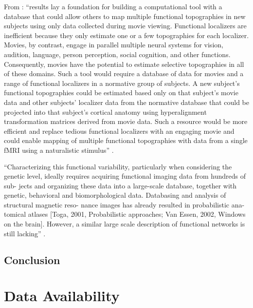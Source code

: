 %
From \citep{jiahui2020predicting}: ``results lay a foundation for building a
computational tool with a database that could allow others to map multiple
functional topographies in new subjects using only data collected during movie
viewing. Functional localizers are inefficient because they only estimate one or
a few topographies for each localizer. Movies, by contrast, engage in parallel
multiple neural systems for vision, audition, language, person perception,
social cognition, and other functions. Consequently, movies have the potential
to estimate selective topographies in all of these domains. Such a tool would
require a database of data for movies and a range of functional localizers in a
normative group of subjects. A new subject's functional topographies could be
estimated based only on that subject's movie data and other subjects’ localizer
data from the normative database that could be projected into that subject’s
cortical anatomy using hyperalignment transformation matrices derived from movie
data. Such a resource would be more efficient and replace tedious functional
localizers with an engaging movie and could enable mapping of multiple
functional topographies with data from a single fMRI using a naturalistic
stimulus'' \citep{jiahui2020predicting}.

``Characterizing this functional variability, particularly when considering the
genetic level, ideally requires acquiring functional imaging data from hundreds
of sub- jects and organizing these data into a large-scale database, together
with genetic, behavioral and biomorphological data. Databasing and analysis of
structural magnetic reso- nance images has already resulted in probabilistic
ana- tomical atlases [Toga, 2001, Probabilistic approaches; Van Essen, 2002,
Windows on the brain]. However, a similar large scale description of
functional networks is still lacking'' \citep{pinel2007fast}.


\subsection{Conclusion}


\section{Data Availability}



